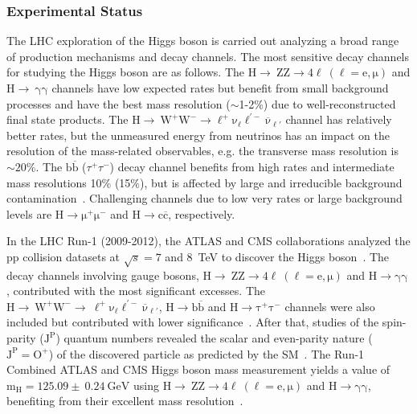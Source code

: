 \subsubsection{Experimental Status}
The LHC exploration of the Higgs boson is carried out analyzing a broad range of production mechanisms and decay channels. The most sensitive decay channels for studying the Higgs boson are as follows. The $\mathrm{H\rightarrow~ZZ\rightarrow 4\ell~(\ell=e,\mu)}$ and $\mathrm{H\rightarrow~\gamma\gamma}$ channels have low expected rates but benefit from small background processes and have the best mass resolution ($\sim$1-2\%) due to well-reconstructed final state products. The $\mathrm{H\rightarrow~W^{+}W^{-}\rightarrow\ell^{+}\nu_{\ell}{\ell}^{\prime-}\overline{\nu}_{\ell\prime}}$ channel has relatively better rates, but the unmeasured energy from neutrinos has an impact on the resolution of the mass-related observables, e.g. the transverse mass resolution is $\sim20\%$. The $\mathrm{b\overline{b}}$ ($\tau^{+}\tau^{-}$) decay channel benefits from high rates and intermediate mass resolutions 10\% (15\%), but is affected by large and irreducible background contamination~\cite{pdg}. Challenging channels due to low very rates or large background levels are $\mathrm{H\rightarrow\mu^{+}\mu^{-}}$ and $\mathrm{H\rightarrow c\overline{c}}$, respectively.

In the LHC Run-1 (2009-2012), the ATLAS and CMS collaborations analyzed the pp collision datasets at $\sqrt{s}=7$ and 8~TeV to discover the Higgs boson~\cite{atlashiggs,cmshiggs}. The decay channels involving gauge bosons, $\mathrm{H\rightarrow~ZZ\rightarrow 4\ell~(\ell=e,\mu)}$ and $\mathrm{H\rightarrow\gamma\gamma}$ , contributed with the most significant excesses.  The $\mathrm{H\rightarrow~W^{+}W^{-}\rightarrow~\ell^{+}\nu_{\ell}{\ell}^{\prime-}\overline{\nu}_{\ell\prime}}$, $\mathrm{H\rightarrow\mathrm{b\overline{b}}}$ and $\mathrm{H\rightarrow\tau^{+}\tau^{-}}$ channels were also included but contributed with lower significance~\cite{atlashiggs,cmshiggs}. After that, studies of the spin-parity ($\mathrm{J^{P}}$) quantum numbers revealed the scalar and even-parity nature ($\mathrm{J^{P}=O^{+}}$) of the discovered particle as predicted by the SM~\cite{atlasrun1_hspinparity,cmsrun1_hmassparityspin}. The Run-1 Combined ATLAS and CMS Higgs boson mass measurement yields a value of $\mathrm{m_{H}=125.09\pm~0.24~GeV}$ using $\mathrm{H\rightarrow~ZZ\rightarrow 4\ell~(\ell=e,\mu)}$ and $\mathrm{H\rightarrow\gamma\gamma}$, benefiting from their excellent mass resolution~\cite{atlascmsrun1hmass}.

